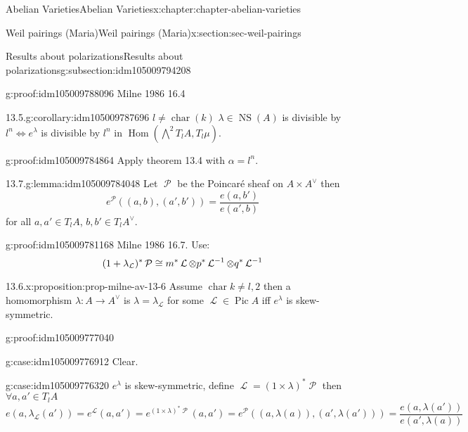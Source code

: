 \documentclass[oneside,10pt,]{book}
\newcommand{\qedhere}{\relax}
\numberwithin{equation}{section}
\newcommand{\sheaf}[1]{\operatorname{\mathcal{#1}}}
\DeclareMathOperator{\Hom}{Hom}
\DeclareMathOperator{\Pic}{Pic}
\DeclareMathOperator{\characteristic}{char}
\DeclareMathOperator{\NS}{NS}
\begin{document}
\begin{chapterptx}{Abelian Varieties}{}{Abelian Varieties}{}{}{x:chapter:chapter-abelian-varieties}
\begin{sectionptx}{Weil pairings (Maria)}{}{Weil pairings (Maria)}{}{}{x:section:sec-weil-pairings}
\begin{subsectionptx}{Results about polarizations}{}{Results about polarizations}{}{}{g:subsection:idm105009794208}
\begin{proofptx}{}{g:proof:idm105009788096}
Milne 1986 16.4%
\end{proofptx}
\begin{corollary}{13.5.}{}{g:corollary:idm105009787696}%
\(l \ne \characteristic (k)\) \(\lambda \in \NS(A) \) is divisible by \(l^n \iff e^\lambda\) is divisible by \(l^n\) in \(\Hom (\bigwedge^2 T_lA, T_l \mu)\).%
\end{corollary}
\begin{proofptx}{}{g:proof:idm105009784864}
Apply theorem 13.4 with \(\alpha = l^n\).%
\end{proofptx}
\begin{lemma}{13.7.}{}{g:lemma:idm105009784048}%
Let \(\sheaf P\) be the Poincaré sheaf on \(A\times A^\vee\) then%
\begin{equation*}
e^{\sheaf P} ((a,b),(a',b')) = \frac{e(a,b')}{e(a',b)}
\end{equation*}
for all \(a,a' \in T_l A\), \(b,b' \in T_l A^\vee\).%
\end{lemma}
\begin{proofptx}{}{g:proof:idm105009781168}
Milne 1986 16.7. Use:%
\begin{equation*}
(1+ \lambda_{\sheaf L})^* \sheaf P \cong m^* \sheaf L \otimes p^* \sheaf L^{-1} \otimes q^* \sheaf L^{-1}\qedhere
\end{equation*}
%
\end{proofptx}
\begin{proposition}{13.6.}{}{x:proposition:prop-milne-av-13-6}%
Assume \(\characteristic k \ne l,2\) then a homomorphism \(\lambda\colon A\to A^\vee\) is \(\lambda = \lambda_{\sheaf L}\) for some \(\sheaf L \in \Pic A\) iff \(e^\lambda\) is skew-symmetric.%
\end{proposition}
\begin{proofptx}{}{g:proof:idm105009777040}
\begin{case}{}{}{g:case:idm105009776912}
Clear.%
\end{case}
\begin{case}{}{}{g:case:idm105009776320}
\(e^\lambda\) is skew-symmetric, define \(\sheaf L = (1 \times \lambda)^* \sheaf P\) then  \(\forall a,a' \in T_l A\)%
\begin{equation*}
e(a,\lambda_{\sheaf L} (a') ) = e^{\sheaf L}(a,a') = e^{(1\times \lambda)^* \sheaf P} (a,a') = e^{\sheaf P}((a,\lambda (a)), (a',\lambda(a'))) = \frac{e(a,\lambda (a'))}{ e(a',\lambda(a))}
\end{equation*}
%
\begin{equation*}

\end{equation*}
\end{case}
\end{proofptx}
\end{subsectionptx}
\end{sectionptx}
\end{chapterptx}
\end{document}
